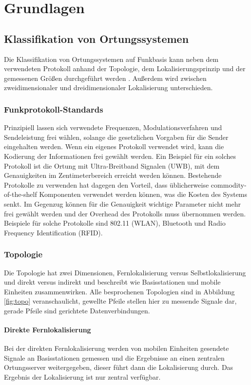 \chapter{Grundlagen}
\label{ch:Grundlagen}

\section{Klassifikation von Ortungssystemen}
\label{ch:Einleitung:sec:Ortungssysteme}
Die Klassifikation von Ortungssystemen auf Funkbasis kann neben dem verwendeten Protokoll anhand der Topologie, dem Lokalisierungsprinzip und der gemessenen Größen durchgeführt werden \cite{liu2007survey}.
Außerdem wird zwischen zweidimensionaler und dreidimensionaler Lokalisierung unterschieden.

\subsection{Funkprotokoll-Standards}
Prinzipiell lassen sich verwendete Frequenzen, Modulationsverfahren und Sendeleistung frei wählen, solange die gesetzlichen Vorgaben für die Sender eingehalten werden. Wenn ein eigenes Protokoll verwendet wird, kann die Kodierung der Informationen frei gewählt werden. 
Ein Beispiel für ein solches Protokoll ist die Ortung mit Ultra-Breitband Signalen (UWB), mit dem Genauigkeiten im Zentimeterbereich erreicht werden können. Bestehende Protokolle zu verwenden hat dagegen den Vorteil, dass üblicherweise commodity-of-the-shelf Komponenten verwendet werden können, was die Kosten des Systems senkt. Im Gegenzug können für die Genauigkeit wichtige Parameter nicht mehr frei gewählt werden und der Overhead des Protokolls muss übernommen werden. Beispiele für solche Protokolle sind 802.11 (WLAN), Bluetooth und Radio Frequency Identification (RFID).

\subsection{Topologie}
Die Topologie hat zwei Dimensionen, Fernlokalisierung versus Selbstlokalisierung und direkt versus indirekt und beschreibt wie Basisstationen und mobile Einheiten zusammenwirken. 
Alle besprochenen Topologien sind in Abbildung \ref{fig:topo} veranschaulicht, gewellte Pfeile stellen hier zu messende Signale dar, gerade Pfeile sind gerichtete Datenverbindungen.\\

\subsubsection{Direkte Fernlokalisierung} 
Bei der direkten Fernlokalisierung werden von mobilen Einheiten gesendete Signale an Basisstationen gemessen und die Ergebnisse an einen zentralen Ortungsserver weitergegeben, dieser führt dann die Lokalisierung durch. Das Ergebnis der Lokalisierung ist nur zentral verfügbar. \\

